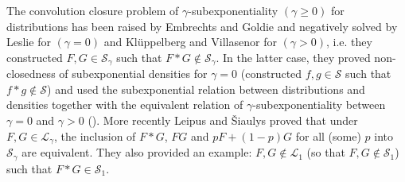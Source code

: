 \documentclass[12pt,leqno]{amsart}
\newcommand{\cals}{{\mathcal S}}
\newcommand{\call}{{\mathcal L}}
\newcommand{\1}{{\mathbf 1}}
\begin{document}
The convolution closure problem of $\gamma$-subexponentiality $(\gamma \ge 0)$
for distributions has been raised by Embrechts and Goldie \cite{Embrechts:Goldie:1980} and negatively solved by 
Leslie \cite{Leslie:1989} for $(\gamma=0)$ and Kl\"uppelberg and Villasenor \cite{Kluppelberg:Villasenor:1991} for $(\gamma>0)$, 
i.e. they constructed $F,G \in \cals_\gamma$ such that $F\ast G \notin \cals_\gamma$.  
In the latter case, they proved non-closedness of 
subexponential densities for $\gamma=0$ (constructed $f,g\in \cals$ such that $f\ast g\notin \cals$) and used 
the subexponential relation between distributions and densities together with 
the equivalent relation of $\gamma$-subexponentiality between $\gamma=0$ and $\gamma>0$ 
(\cite[Theorem 1]{Kluppelberg:Villasenor:1991}).  
More recently Leipus and \v{S}iaulys \cite{Leipus:Siaulys:2020} proved that 
under $F,G \in \call_\gamma$, the inclusion of $F\ast G$, $FG$ and $pF+(1-p)G$ for all (some) $p$ into 
$\cals_\gamma$ are equivalent. They also provided an example: $F,G \notin \call_1$ (so that $F,G \notin \cals_1$) such that $F\ast G \in \cals_1$. 
\end{document}
